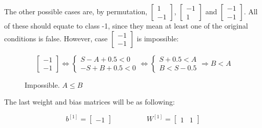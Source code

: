 \documentclass[12pt]{article}
\begin{document}
\begin{itemize}
            The other possible cases are, by permutation, $\begin{bmatrix}1\\-1\end{bmatrix}$, $\begin{bmatrix}-1\\1\end{bmatrix}$ and $\begin{bmatrix}-1\\-1\end{bmatrix}$. All of these should equate to class -1, since they mean at least one of the original conditions is false. However, case $\begin{bmatrix}-1\\-1\end{bmatrix}$ is impossible:

                \begin{figure}[H]
                    \[
                        \begin{bmatrix}
                            -1\\
                            -1
                        \end{bmatrix}
                        \Leftrightarrow
                        \begin{cases}
                            S - A + 0.5 < 0 \\
                            -S + B + 0.5 < 0
                        \end{cases}
                        \Leftrightarrow
                        \begin{cases}
                            S+0.5 < A \\
                            B < S-0.5
                        \end{cases}
                        \Rightarrow
                        B < A
                    \]
                    \caption*{Impossible. $A \leq B$}
                \end{figure}

        The last weight and bias matrices will be as following:

        \[
            b^{[1]} = \begin{bmatrix}
                -1
            \end{bmatrix}
            \hspace{2cm}
            W^{[1]} = \begin{bmatrix}
                1 & 1
            \end{bmatrix}
        \]


\end{itemize}
\end{document}
